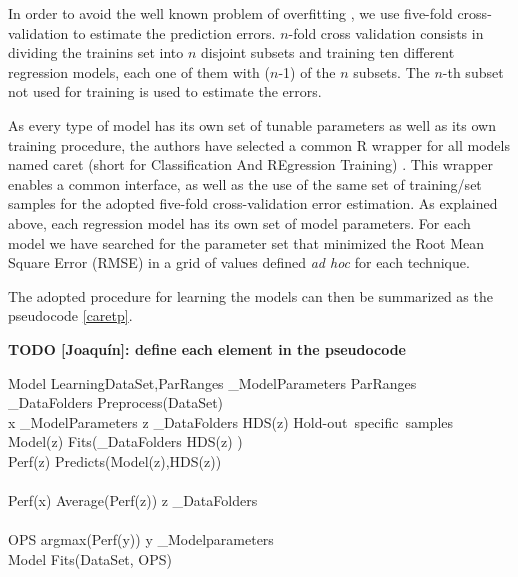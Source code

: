 {In order to avoid the well known problem of overfitting \cite[see
e.g.][]{Dietterich:1995:OUM:212094.212114}, we use five-fold
cross-validation to estimate the prediction errors. $n$-fold cross
validation consists in dividing the trainins set into $n$ disjoint
subsets and training ten different regression models, each one of them
with ($n$-1) of the $n$ subsets. The $n$-th subset not used for
training is used to estimate the errors.

As every type of model has its own set of tunable parameters as well
as its own training procedure, the authors have selected a common
R \cite{R2016} wrapper for all models named caret (short for
Classification And REgression Training) \cite{caret}.  This wrapper
enables a common interface, as well as the use of the same set of
training/set samples for the adopted five-fold cross-validation error
estimation. As explained above, each regression model has its own set
of model parameters. For each model we have searched for the parameter
set that minimized the Root Mean Square Error (RMSE) in a grid of
values defined {\it ad hoc} for each technique.

The adopted procedure for learning the models can then be summarized
as the pseudocode \ref{caretp}.

{\bf TODO [Joaquín]: define each element in the pseudocode}

\begin{pseudocode}[shadowbox]{Model Learning}{DataSet,ParRanges}
\label{caretp}
 _{ModelParameters} \GETS ParRanges \\
 _{DataFolders} \GETS Preprocess(DataSet) \\ 
 \FOREACH x \in {}_{ModelParameters} \DO
  \BEGIN
    \FOREACH z \in {}_{DataFolders} \DO
      \BEGIN
	HDS(z) \GETS \mbox{Hold-out specific samples} \\
	Model(z) \GETS Fits(_{DataFolders} \setminus HDS(z) ) \\
	Perf(z) \GETS Predicts(Model(z),HDS(z)) \\
      \END \\
    Perf(x) \GETS Average(Perf(z)) \quad \forall z \in {}_{DataFolders} \\
  \END \\
  
  OPS \GETS argmax(Perf(y)) \quad \forall y \in {}_{Modelparameters} \\
  Model \GETS Fits(DataSet, OPS) \\
\end{pseudocode}

}
